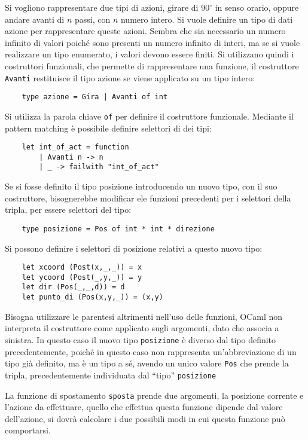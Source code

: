 \documentclass{article}
\numberwithin{equation}{subsection}
\begin{document}
Si vogliono rappresentare due tipi di azioni, girare di $90^\circ$ in senso orario, oppure andare avanti di $n$ passi, con $n$ numero intero. Si vuole definire un tipo di dati azione per rappresentare queste azioni. Sembra che sia necessario un numero infinito di valori poiché sono presenti un numero infinito di interi, ma se si vuole realizzare un tipo enumerato, i valori devono essere finiti. Si utilizzano quindi i costruttori funzionali, che permette di rappresentare una funzione, il costruttore \verb|Avanti| restituisce il tipo azione se viene applicato su un tipo intero:
\begin{verbatim}
    type azione = Gira | Avanti of int
\end{verbatim}
Si utilizza la parola chiave \verb|of| per definire il costruttore funzionale. Mediante il pattern matching è possibile definire selettori di dei tipi:
\begin{verbatim}
    let int_of_act = function 
        | Avanti n -> n
        | _ -> failwith "int_of_act"
\end{verbatim}
Se si fosse definito il tipo posizione introducendo un nuovo tipo, con il suo costruttore, bisognerebbe modificar ele funzioni precedenti per i selettori della tripla, per essere selettori del tipo:
\begin{verbatim}
    type posizione = Pos of int * int * direzione
\end{verbatim}
Si possono definire i selettori di posizione relativi a questo nuovo tipo:
\begin{verbatim}
    let xcoord (Post(x,_,_)) = x
    let ycoord (Post(_,y,_)) = y
    let dir (Pos(_,_,d)) = d
    let punto_di (Pos(x,y,_)) = (x,y)
\end{verbatim}
Bisogna utilizzare le parentesi altrimenti nell'uso delle funzioni, OCaml non interpreta il costruttore come applicato sugli argomenti, dato che associa a sinistra. 
In questo caso il nuovo tipo \verb|posizione| è diverso dal tipo definito precedentemente, poiché in questo caso non rappresenta un'abbreviazione di un tipo già definito, ma è un tipo a sé, avendo un unico valore \verb|Pos| che prende la tripla, precedentemente individuata dal ``tipo'' \verb|posizione|



La funzione di spostamento \verb|sposta| prende due argomenti, la posizione corrente e l'azione da effettuare, quello che effettua questa funzione dipende dal valore dell'azione, si dovrà calcolare i due possibili modi in cui questa funzione può comportarsi. 
\end{document}
